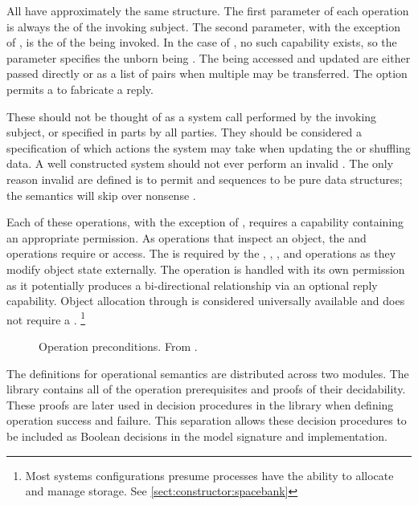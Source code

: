 All \TMops{} have approximately the same structure.
The first parameter of each operation is always the \TMref{} of the invoking subject.
The second parameter, with the exception of \TMcreate{}, is the \TMidx{} of the \TMcap{} being invoked.
In the case of \TMcreate{}, no such capability exists, so the parameter specifies the unborn \TMobj{} being \TMcreated{}.
The \TMidxs{} being accessed and updated are either passed directly or as a list of \TMidx{} pairs when multiple \TMcaps{} may be transferred.
The \TMidx{} option permits a \TMsend{} \TMop{} to fabricate a reply.

These \TMops{} should not be thought of as a system call performed by the invoking subject, or specified in parts by all parties.
They should be considered a specification of which actions the system may take when updating the \TMsystemState{} or shuffling data.
A well constructed system should not ever perform an invalid \TMop{}.
The only reason invalid \TMops{} are defined is to permit \TMops{} and \TMop{} sequences to be pure data structures; the semantics will skip over nonsense \TMops{}.

Each of these operations, with the exception of \COQcreate{}, requires a capability containing an appropriate permission.  
As operations that inspect an object, the \COQread{} and \COQfetch{} operations require \COQrd{} or \COQwk{} access.
The \COQwr{} \TMaccessRight{} is required by the \TMfetch{}, \TMstore{}, \TMrevoke{}, and \TMdestroy{} operations as they modify object state externally.
The \COQsend{} operation is handled with its own permission as it potentially produces a bi-directional relationship via an optional reply capability.
Object allocation through \COQcreate{} is considered universally available and does not require a \TMcap{}. \footnote{Most systems configurations presume processes have the ability to allocate and manage storage.  See \cref{sect:constructor:spacebank}}

\begin{figure}
  \COQDOCPreconditions{}
  \caption{Operation preconditions.  From \COQSemanticsDefinitions{}. \label{fig:embed:preconditions}}
\end{figure}

The definitions for \TMmodelName{} operational semantics are distributed across two modules.
The library \COQSemanticsDefinitions{} contains all of the operation prerequisites and proofs of their decidability.
These proofs are later used in decision procedures in the \COQSemantics{} library when defining operation success and failure.
This separation allows these decision procedures to be included as Boolean decisions in the model signature and implementation.

